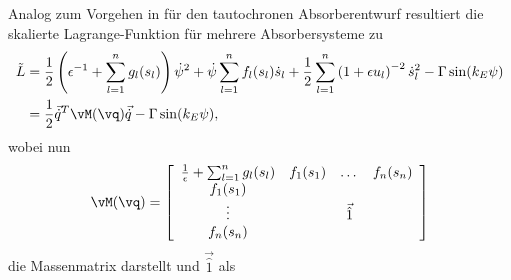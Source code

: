 Analog zum Vorgehen in  für den tautochronen Absorberentwurf resultiert die skalierte Lagrange-Funktion für mehrere Absorbersysteme zu 
%
%
%
\begin{equation}
	\begin{split}
	\tilde{L} &= \frac{1}{2} \left(\epsilon^{-1} + \sum_{l=1}^n g_l(s_l) \right)\dot{\psi}^2 + \dot{\psi} \sum_{l=1}^n f_l(s_l) \dot{s}_l 
							+ \frac{1}{2} \sum_{l=1}^n  \left(1+\epsilon u_l  \right)^{-2} \dot{s}^2_l - \Gamma \sin(k_E \psi)\\   				
						&= \frac{1}{2} \vec{\dot{q}}^T \vM(\vq) \vec{\dot{q}} - \Gamma \sin(k_E \psi), 
	\end{split}
	\label{eq:SkalierteLagrangeFunktionfuerMehrereAbsorbersystemMitMistuning}
\end{equation}
%
%
%
wobei nun
\begin{equation}
	\vM(\vq) = 			\left[\begin{array}{cccc}
												\frac{1}{\epsilon} + \sum_{l=1}^n g_l(s_l) 	& f_1(s_1) & \dots  & f_n(s_n) 	\\
													f_1(s_1)																	&   			 & 			 &  	  \\
													\vdots																		&   			 & \vec{\hat{1}}	 &  	  \\
													f_n(s_n)																	&   			 & 			 &  	  \\
												\end{array} \right]
	\label{eq:SkalierteLagrangeFunktionfuerMehrereAbsorbersystemMassenmatrixMitMistuning}
\end{equation}
die Massenmatrix darstellt und $\vec{\hat{1}}$ als
%
%
%
%
